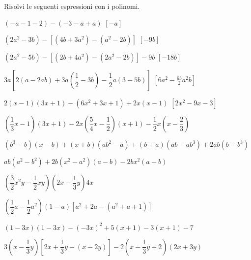 \begin{esercizio}[\Ast]
\label{ese:10.21}
Risolvi le seguenti espressioni con i polinomi.
 \begin{enumeratea}
\spazielenx
 \item \((-a-1-2)-(-3-a+a)\)
  \hfill \(\left[-a\right]\)
 \item \(\left(2a^{2}-3b\right)-\left[\left(4b+3a^{2}\right)-
        \left(a^{2}-2b\right)\right]\)
  \hfill \(\left[-9b\right]\)
 \item \(\left(2a^{2}-5b\right)-\left[\left(2b+4a^{2}\right)-
        \left(2a^{2}-2b\right)\right]-9b\)
  \hfill \(\left[-18b\right]\)
 \item \(3a\left[2(a-2{ab})+3a\left(\dfrac{1}{2}-3b\right)-
        \dfrac{1}{2}a(3-5b)\right]\)
  \hfill \(\left[6a^{2}-\frac{63}{2}a^{2}b\right]\)
 \item \(2(x-1)(3x+1)-\left(6x^{2}+3x+1\right)+2x(x-1)\)
  \hfill \(\left[2x^2-9x-3\right]\)
 \item 
\(\left(\dfrac{1}{3}x-1\right)(3x+1)-2x\left(\dfrac{5}{4}x-\dfrac{1}{2}
\right)(x+1)-\dfrac{1}{2}x\left(x-\dfrac{2}{3}\right)\)
 \item 
\(\left(b^{3}-b\right)(x-b)+(x+b)\left(ab^{2}-a\right)+(b+a)\left(ab-ab^{3}
\right)+2ab\left(b-b^{3}\right)\)
 \item 
\(ab\left(a^{2}-b^{2}\right)+2b\left(x^{2}-a^{2}\right)(a-b)-2bx^{2}(a-b)\)
 \item 
\(\left(\dfrac{3}{2}x^{2}y-\dfrac{1}{2}{xy}\right)\left(2x-\dfrac{1}{3}
y\right)4x\)
 \item 
\(\left(\dfrac{1}{2}a-\dfrac{1}{2}a^{2}\right)(1-a)\left[a^{2}+2a-\left(a^{2}
+a+1\right)\right]\)
% 
 \item \((1-3x)(1-3x)-(-3x)^{2}+5(x+1)-3(x+1)-7\)
 \item 
\(3\left(x-\dfrac{1}{3}y\right)\left[2x+\dfrac{1}{3}y-(x-2y)\right]
-2\left(x-\dfrac{1}{3}y+2\right)(2x+3y)\)

\end{enumeratea}
\end{esercizio}
